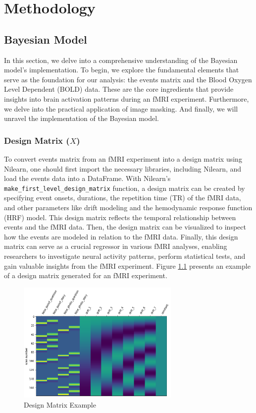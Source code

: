 \chapter{Methodology}  

\section{Bayesian Model}

In this section, we delve into a comprehensive understanding of the Bayesian model's implementation. To begin, we explore the fundamental elements that serve as the foundation for our analysis: the events matrix and the Blood Oxygen Level Dependent (BOLD) data. These are the core ingredients that provide insights into brain activation patterns during an fMRI experiment. Furthermore, we delve into the practical application of image masking. And finally, we will unravel the implementation of the Bayesian model.

\subsection{Design Matrix ($X$)}

To convert events matrix from an fMRI experiment into a design matrix using Nilearn, one should first import the necessary libraries, including Nilearn, and load the events data into a DataFrame. With Nilearn's  \texttt{make\_first\_level\_design\_matrix} function, a design matrix can be created by specifying event onsets, durations, the repetition time (TR) of the fMRI data, and other parameters like drift modeling and the hemodynamic response function (HRF) model. This design matrix reflects the temporal relationship between events and the fMRI data. Then, the design matrix can be visualized to inspect how the events are modeled in relation to the fMRI data. Finally, this design matrix can serve as a crucial regressor in various fMRI analyses, enabling researchers to investigate neural activity patterns, perform statistical tests, and gain valuable insights from the fMRI experiment. Figure \ref{fig:c3_DesignMatrix} presents an example of a design matrix generated for an fMRI experiment.

\begin{figure}[htbp!]
\centering
\includegraphics[width=0.7\textwidth]{images/DesignMatrix.png}
\caption{Design Matrix Example}
\label{fig:c3_DesignMatrix}
\end{figure}

